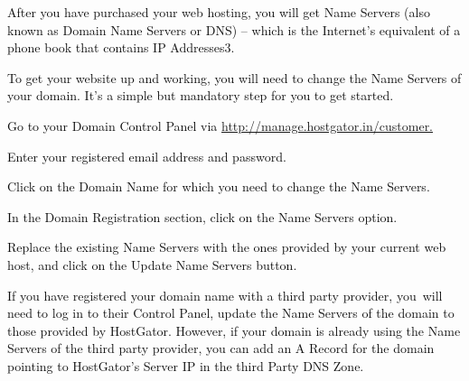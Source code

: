 \documentclass[12pt]{report}
\renewcommand{\_}{\kern-1.5pt\textunderscore\kern-1.5pt}
\begin{document}
\begin{adjustwidth}{1.18in}{0.7in}
 \tabto{0.59in} \textcolor[HTML]{0D0D0D}{After you have purchased your web hosting, you will get Name Servers (also known as Domain Name Servers or DNS) – which is the Internet’s equivalent of a phone book that contains IP Addresses3.}\par

\end{adjustwidth}


\vspace{\baselineskip}\begin{adjustwidth}{1.18in}{0.57in}
\textcolor[HTML]{0D0D0D}{To get your website up and working, you will need to change the Name Servers of your domain. It’s a simple but mandatory step for you to get started.}\par

\end{adjustwidth}

	\item \textcolor[HTML]{0D0D0D}{Go to your Domain Control Panel via \href{http://manage.hostgator.in/customer}{http://manage.hostgator.in/customer.}}\par

	\item \textcolor[HTML]{0D0D0D}{Enter your registered email address and password.}\par

	\item \textcolor[HTML]{0D0D0D}{Click on the Domain Name for which you need to change the Name Servers.}\par

	\item \textcolor[HTML]{0D0D0D}{In the Domain Registration section, click on the Name Servers option.}\par

	\item \textcolor[HTML]{0D0D0D}{Replace the existing Name Servers with the ones provided by your current web host, and click on the Update Name Servers button.}\par

 \tabto{0.59in} \textcolor[HTML]{0D0D0D}{If you have registered your domain name with a third party provider, you\ will need  to log in to their Control Panel, update the Name Servers of the domain to those provided by HostGator. However, if your domain is already using the Name Servers of the third party provider, you can add an A Record for the domain pointing to HostGator’s Server IP in the third Party DNS Zone.\tab }\par
\end{document}

